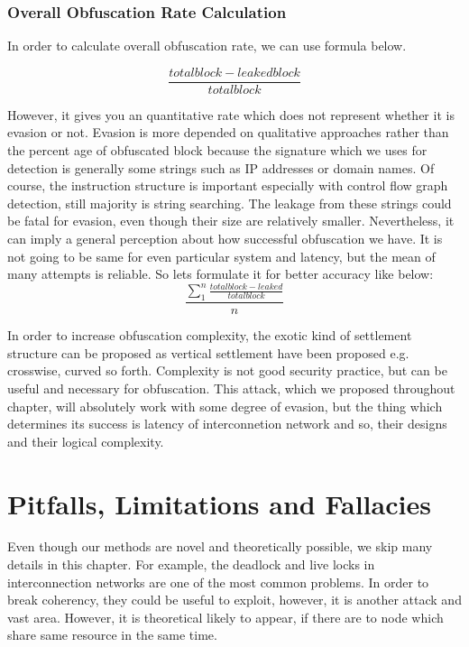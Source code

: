 \subsubsection{Overall Obfuscation Rate Calculation}
In order to calculate overall obfuscation rate, we can use formula below. 

\begin{equation}
	\frac{totalblock-leakedblock}{totalblock}
\end{equation}

However, it gives you an quantitative rate which does not represent whether it is evasion or not. Evasion is more depended on qualitative approaches rather than the percent age of obfuscated block because the signature which we uses for detection is generally some strings such as IP addresses or domain names. Of course, the instruction structure is important especially with control flow graph detection, still majority is string searching. The leakage from these strings could be fatal for evasion, even though their size are relatively smaller. Nevertheless, it can imply a general perception about how successful obfuscation we have. It is not going to be same for even particular system and latency, but the mean of many attempts is reliable. So lets formulate it for better accuracy like below:
\begin{equation}
	\frac{\sum_{1}^{n}\frac{totalblock-leaked}{totalblock}}{n}
\end{equation}

In order to increase obfuscation complexity, the exotic kind of settlement structure can be proposed as vertical settlement have been proposed e.g. crosswise, curved so forth. Complexity is not good security practice, but can be useful and necessary for obfuscation. This attack, which we proposed  throughout chapter, will absolutely work with some degree of evasion, but the thing which determines its success is latency of interconnetion network and so, their designs and their logical complexity.

\section{Pitfalls, Limitations and Fallacies}
Even though our methods are novel and theoretically possible, we skip many details in this chapter. For example, the deadlock and live locks in interconnection networks are one of the most common problems. In order to break coherency, they could be useful to exploit, however, it is another attack and vast area. However, it is theoretical likely to appear, if there are to node which share same resource in the same time. 


